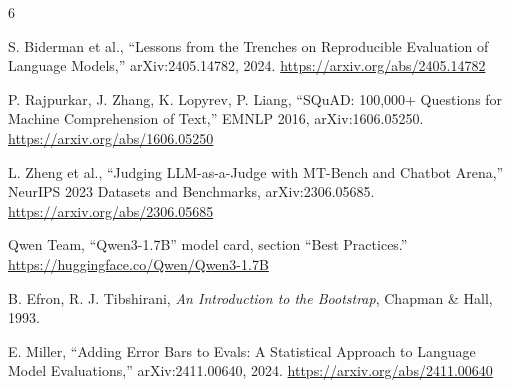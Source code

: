 \documentclass[11pt,a4paper]{article}
\begin{document}
\begin{thebibliography}{6}

 S. Biderman et al., ``Lessons from the Trenches on Reproducible
  Evaluation of Language Models,'' arXiv:2405.14782, 2024.
  \url{https://arxiv.org/abs/2405.14782}

 P. Rajpurkar, J. Zhang, K. Lopyrev, P. Liang, ``SQuAD: 100,000+
  Questions for Machine Comprehension of Text,'' EMNLP 2016, arXiv:1606.05250.
  \url{https://arxiv.org/abs/1606.05250}

 L. Zheng et al., ``Judging LLM-as-a-Judge with MT-Bench and Chatbot
  Arena,'' NeurIPS 2023 Datasets and Benchmarks, arXiv:2306.05685.
  \url{https://arxiv.org/abs/2306.05685}

 Qwen Team, ``Qwen3-1.7B'' model card, section ``Best Practices.''
  \url{https://huggingface.co/Qwen/Qwen3-1.7B}

 B. Efron, R. J. Tibshirani, \emph{An Introduction to the Bootstrap},
  Chapman \& Hall, 1993.

 E. Miller, ``Adding Error Bars to Evals: A Statistical Approach to
  Language Model Evaluations,'' arXiv:2411.00640, 2024.
  \url{https://arxiv.org/abs/2411.00640}

\end{thebibliography}
\end{document}
